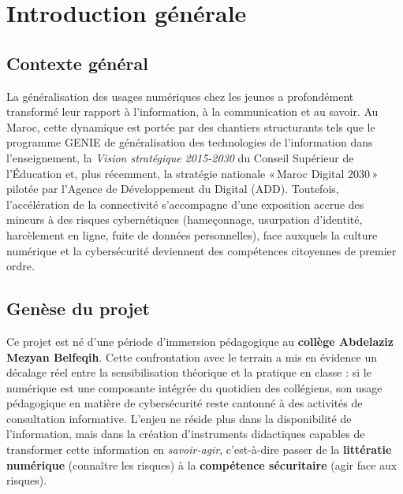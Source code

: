 \documentclass[12pt, a4paper, oneside]{report}
\begin{document}
\tableofcontents
\listoftables
\listoffigures

\clearpage
{}

\chapter*{Introduction générale}

\section*{Contexte général}
La généralisation des usages numériques chez les jeunes a profondément transformé leur rapport à l'information, à la communication et au savoir. Au Maroc, cette dynamique est portée par des chantiers structurants tels que le programme GENIE de généralisation des technologies de l'information dans l'enseignement, la \textit{Vision stratégique 2015-2030} du Conseil Supérieur de l'Éducation et, plus récemment, la stratégie nationale «\,Maroc Digital 2030\,» pilotée par l'Agence de Développement du Digital (ADD). Toutefois, l'accélération de la connectivité s'accompagne d'une exposition accrue des mineurs à des risques cybernétiques (hameçonnage, usurpation d'identité, harcèlement en ligne, fuite de données personnelles), face auxquels la culture numérique et la cybersécurité deviennent des compétences citoyennes de premier ordre.

\section*{Genèse du projet}
Ce projet est né d'une période d'immersion pédagogique au \textbf{collège Abdelaziz Mezyan Belfeqih}. Cette confrontation avec le terrain a mis en évidence un décalage réel entre la sensibilisation théorique et la pratique en classe : si le numérique est une composante intégrée du quotidien des collégiens, son usage pédagogique en matière de cybersécurité reste cantonné à des activités de consultation informative. L'enjeu ne réside plus dans la disponibilité de l'information, mais dans la création d'instruments didactiques capables de transformer cette information en \textit{savoir-agir}, c'est-à-dire passer de la \textbf{littératie numérique} (connaître les risques) à la \textbf{compétence sécuritaire} (agir face aux risques).
\end{document}
